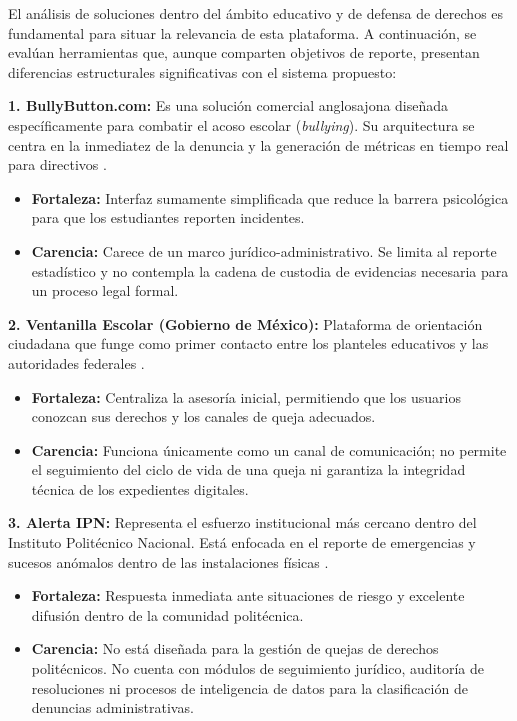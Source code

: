 \begin{flushleft}
\justifying
El análisis de soluciones dentro del ámbito educativo y de defensa de derechos es fundamental para situar la relevancia de esta plataforma. A continuación, se evalúan herramientas que, aunque comparten objetivos de reporte, presentan diferencias estructurales significativas con el sistema propuesto:

\textbf{1. BullyButton.com:}
Es una solución comercial anglosajona diseñada específicamente para combatir el acoso escolar (\textit{bullying}). Su arquitectura se centra en la inmediatez de la denuncia y la generación de métricas en tiempo real para directivos \cite{21}.
\begin{itemize}
    \item \textbf{Fortaleza:} Interfaz sumamente simplificada que reduce la barrera psicológica para que los estudiantes reporten incidentes.
    \item \textbf{Carencia:} Carece de un marco jurídico-administrativo. Se limita al reporte estadístico y no contempla la cadena de custodia de evidencias necesaria para un proceso legal formal.
\end{itemize}

\textbf{2. Ventanilla Escolar (Gobierno de México):}
Plataforma de orientación ciudadana que funge como primer contacto entre los planteles educativos y las autoridades federales \cite{22}.
\begin{itemize}
    \item \textbf{Fortaleza:} Centraliza la asesoría inicial, permitiendo que los usuarios conozcan sus derechos y los canales de queja adecuados.
    \item \textbf{Carencia:} Funciona únicamente como un canal de comunicación; no permite el seguimiento del ciclo de vida de una queja ni garantiza la integridad técnica de los expedientes digitales.
\end{itemize}

\textbf{3. Alerta IPN:}
Representa el esfuerzo institucional más cercano dentro del Instituto Politécnico Nacional. Está enfocada en el reporte de emergencias y sucesos anómalos dentro de las instalaciones físicas \cite{23}.
\begin{itemize}
    \item \textbf{Fortaleza:} Respuesta inmediata ante situaciones de riesgo y excelente difusión dentro de la comunidad politécnica.
    \item \textbf{Carencia:} No está diseñada para la gestión de quejas de derechos politécnicos. No cuenta con módulos de seguimiento jurídico, auditoría de resoluciones ni procesos de inteligencia de datos para la clasificación de denuncias administrativas.
\end{itemize}


\end{flushleft}
